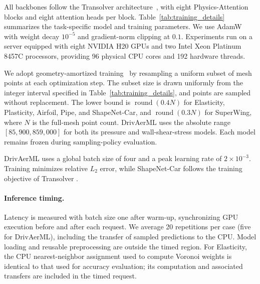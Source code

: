 All backbones follow the Transolver architecture~\citep{wu2024transolver}, with eight Physics-Attention blocks and eight attention heads per block. Table~\ref{tab:training_details} summarizes the task-specific model and training parameters. We use AdamW with weight decay $10^{-5}$ and gradient-norm clipping at $0.1$. Experiments run on a server equipped with eight NVIDIA H20 GPUs and two Intel Xeon Platinum 8457C processors, providing 96 physical CPU cores and 192 hardware threads.



We adopt geometry-amortized training~\citep{zhou2026transolver3} by resampling a uniform subset of mesh points at each optimization step. The subset size is drawn uniformly from the integer interval specified in Table~\ref{tab:training_details}, and points are sampled without replacement. The lower bound is $\operatorname{round}(0.4N)$ for Elasticity, Plasticity, Airfoil, Pipe, and ShapeNet-Car, and $\operatorname{round}(0.3N)$ for SuperWing, where $N$ is the full-mesh point count. DrivAerML uses the absolute range $[85{,}900,859{,}000]$ for both its pressure and wall-shear-stress models. Each model remains frozen during sampling-policy evaluation.

DrivAerML uses a global batch size of four and a peak learning rate of \(2\times10^{-3}\). Training minimizes relative \(L_2\) error, while ShapeNet-Car follows the training objective of Transolver \citep{wu2024transolver}.

\paragraph{Inference timing.}
Latency is measured with batch size one after warm-up, synchronizing GPU
execution before and after each request. We average 20 repetitions per
case (five for DrivAerML), including the transfer of sampled predictions
to the CPU. Model loading and reusable preprocessing are outside the
timed region.
For Elasticity, the CPU nearest-neighbor assignment used to compute
Voronoi weights is identical to that used for accuracy evaluation; its
computation and associated transfers are included in the timed request.


